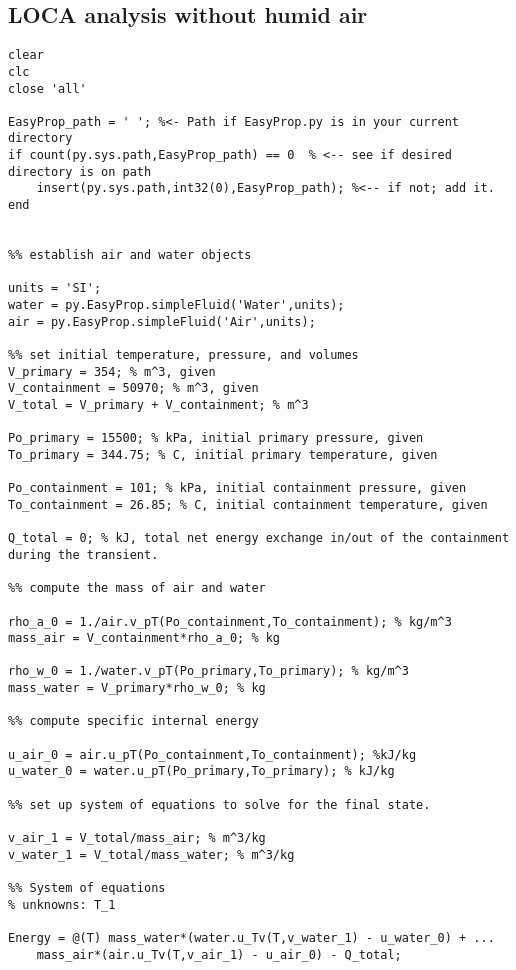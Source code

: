 \begin{fullwidth}
\section{LOCA analysis without humid air}
\begin{lstlisting}
clear
clc
close 'all'

EasyProp_path = ' '; %<- Path if EasyProp.py is in your current directory
if count(py.sys.path,EasyProp_path) == 0  % <-- see if desired directory is on path
    insert(py.sys.path,int32(0),EasyProp_path); %<-- if not; add it.
end


%% establish air and water objects

units = 'SI';
water = py.EasyProp.simpleFluid('Water',units);
air = py.EasyProp.simpleFluid('Air',units);

%% set initial temperature, pressure, and volumes
V_primary = 354; % m^3, given
V_containment = 50970; % m^3, given
V_total = V_primary + V_containment; % m^3

Po_primary = 15500; % kPa, initial primary pressure, given
To_primary = 344.75; % C, initial primary temperature, given

Po_containment = 101; % kPa, initial containment pressure, given
To_containment = 26.85; % C, initial containment temperature, given

Q_total = 0; % kJ, total net energy exchange in/out of the containment during the transient.

%% compute the mass of air and water

rho_a_0 = 1./air.v_pT(Po_containment,To_containment); % kg/m^3
mass_air = V_containment*rho_a_0; % kg

rho_w_0 = 1./water.v_pT(Po_primary,To_primary); % kg/m^3
mass_water = V_primary*rho_w_0; % kg

%% compute specific internal energy

u_air_0 = air.u_pT(Po_containment,To_containment); %kJ/kg
u_water_0 = water.u_pT(Po_primary,To_primary); % kJ/kg

%% set up system of equations to solve for the final state.

v_air_1 = V_total/mass_air; % m^3/kg 
v_water_1 = V_total/mass_water; % m^3/kg

%% System of equations
% unknowns: T_1

Energy = @(T) mass_water*(water.u_Tv(T,v_water_1) - u_water_0) + ...
    mass_air*(air.u_Tv(T,v_air_1) - u_air_0) - Q_total;


\end{lstlisting}
\end{fullwidth}
